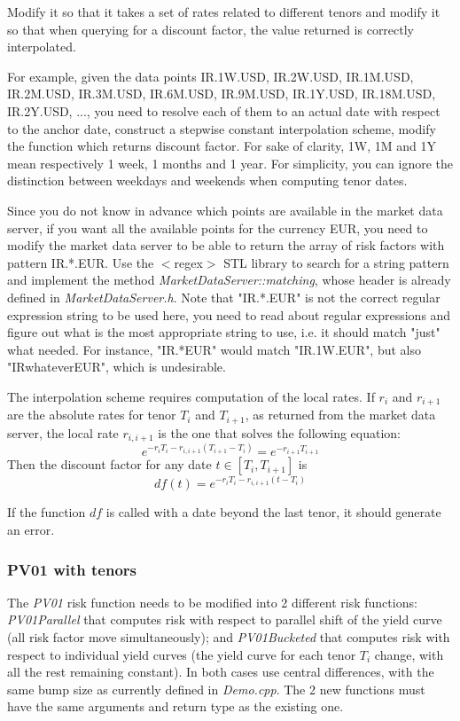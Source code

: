 \documentclass[10pt]{article}
\begin{document}
Modify it so that it takes a set of rates related to different tenors and modify it so that when querying for a discount factor, the value returned is correctly interpolated.

For example, given the data points {IR.1W.USD, IR.2W.USD, IR.1M.USD, IR.2M.USD, IR.3M.USD, IR.6M.USD, IR.9M.USD, IR.1Y.USD, IR.18M.USD, IR.2Y.USD, ...}, you need to resolve each of them to an actual date with respect to the anchor date, construct a stepwise constant interpolation scheme, modify the function which returns discount factor. For sake of clarity, 1W, 1M and 1Y mean respectively 1 week, 1 months and 1 year. For simplicity, you can ignore the distinction between weekdays and weekends when computing tenor dates.

Since you do not know in advance which points are available in the market data server, if you want all the available points for the currency EUR, you need to modify the market data server to be able to return the array of risk factors with pattern IR.*.EUR. Use the $<$regex$>$ STL library to search for a string pattern and implement the method \textit{MarketDataServer::matching}, whose header is already defined in \textit{MarketDataServer.h}. Note that "IR.*.EUR" is not the correct regular expression string to be used here, you need to read about regular expressions and figure out what is the most appropriate string to use, i.e. it should match "just" what needed. For instance, "IR.*EUR" would match "IR.1W.EUR", but also "IRwhateverEUR", which is undesirable.

The interpolation scheme requires computation of the local rates. If $r_i$ and $r_{i+1}$ are the absolute rates for tenor $T_i$ and $T_{i+1}$, as returned from the market data server, the local rate $r_{i,i+1}$ is the one that solves the following equation:
 $$e^{-r_iT_i-r_{i,i+1}(T_{i+1}-T_i)}=e^{-r_{i+1}T_{i+1}}$$
Then the discount factor for any date $t \in [T_i,T_{i+1}]$ is $$df(t)=e^{-r_i T_i-r_{i,i+1}(t-T_i)}$$

If the function $df$ is called with a date beyond the last tenor, it should generate an error.

\subsubsection{PV01 with tenors}
\label{sec:pv01}
The \textit{PV01} risk function needs to be modified into 2 different risk functions: \textit{PV01Parallel} that computes risk with respect to parallel shift of the yield curve (all risk factor move simultaneously); and \textit{PV01Bucketed} that computes risk with respect to individual yield curves (the yield curve for each tenor $T_i$ change, with all the rest remaining constant). In both cases use central differences, with the same bump size as currently defined in \textit{Demo.cpp}. The 2 new functions must have the same arguments and return type as the existing one. \\
\end{document}
